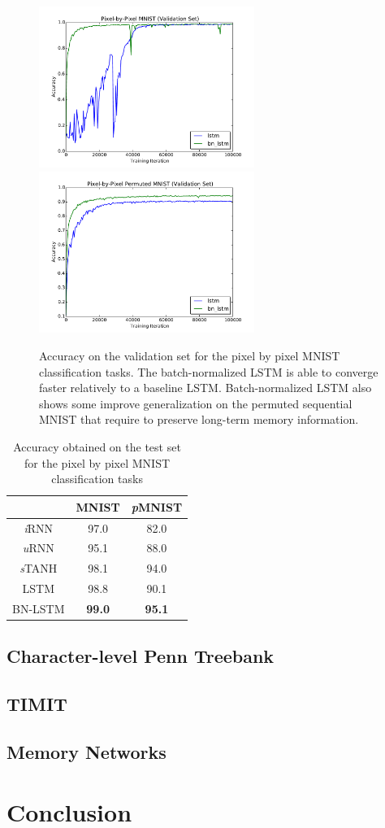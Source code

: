 \documentclass{article} %
\begin{document}
\begin{figure}
\center
\includegraphics[width=7cm]{figures/unpermuted_valid.pdf}
\includegraphics[width=7cm]{figures/permuted_valid.pdf}
\caption{Accuracy on the validation set for the pixel by pixel MNIST classification tasks. The batch-normalized LSTM is able to converge faster relatively to a baseline LSTM.
  Batch-normalized  LSTM also shows some improve generalization on the permuted sequential MNIST that require to preserve long-term memory information.}
\label{fig:seqmnist_valid}
\end{figure}


\begin{table}
\center
\begin{tabular}{c|c|c}
  \hline
  & MNIST & \textit{p}MNIST\\
  \hline
  \textit{i}RNN & 97.0 & 82.0\\
  \textit{u}RNN & 95.1 & 88.0\\
  \textit{s}TANH & 98.1 & 94.0\\
  \hline
  LSTM & 98.8 & 90.1\\
  BN-LSTM & \textbf{99.0} & \textbf{95.1}\\
\end{tabular}
\caption{Accuracy obtained on the test set for the pixel by pixel MNIST classification tasks}
\label{tab:seqmnist_test}

\end{table}

\subsection{Character-level Penn Treebank}

\subsection{TIMIT}

\subsection{Memory Networks}

\section{Conclusion}
\end{document}
